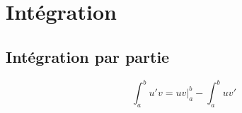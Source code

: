 \documentclass[]{article}
\begin{document}
\section{Intégration}
\subsection{Intégration par partie}
$$\int_{a}^{b}u'v=uv\Big|_{a}^{b}-\int_{a}^{b}uv'$$
\end{document}
